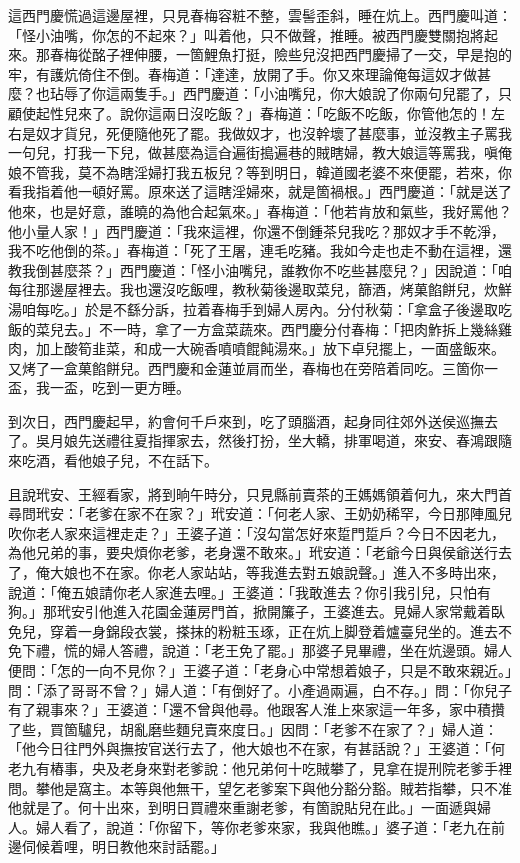 這西門慶慌過這邊屋裡，只見春梅容粧不整，雲髻歪斜，睡在炕上。西門慶叫道：「怪小油嘴，你怎的不起來？」叫着他，只不做聲，推睡。被西門慶雙關抱將起來。那春梅從酩子裡伸腰，一箇鯉魚打挺，險些兒沒把西門慶掃了一交，早是抱的牢，有護炕倚住不倒。春梅道：「達達，放開了手。你又來理論俺每這奴才做甚麼？也玷辱了你這兩隻手。」{}西門慶道：「小油嘴兒，你大娘說了你兩句兒罷了，只顧使起性兒來了。說你這兩日沒吃飯？」春梅道：「吃飯不吃飯，你管他怎的！左右是奴才貨兒，死便隨他死了罷。我做奴才，也沒幹壞了甚麼事，並沒教主子罵我一句兒，打我一下兒，做甚麼為這㒲遍街搗遍巷的賊瞎婦，教大娘這等罵我，嗔俺娘不管我，莫不為瞎淫婦打我五板兒？{}等到明日，韓道國老婆不來便罷，若來，你看我指着他一頓好罵。原來送了這瞎淫婦來，就是箇禍根。」西門慶道：「就是送了他來，也是好意，誰曉的為他合起氣來。」春梅道：「他若肯放和氣些，我好罵他？他小量人家！」西門慶道：「我來這裡，你還不倒鍾茶兒我吃？那奴才手不乾淨，我不吃他倒的茶。」春梅道：「死了王屠，連毛吃豬。我如今走也走不動在這裡，還教我倒甚麼茶？」西門慶道：「怪小油嘴兒，誰教你不吃些甚麼兒？」因說道：「咱每往那邊屋裡去。我也還沒吃飯哩，教秋菊後邊取菜兒，篩酒，烤菓餡餅兒，炊鮮湯咱每吃。」於是不繇分訴，拉着春梅手到婦人房內。分付秋菊：「拿盒子後邊取吃飯的菜兒去。」不一時，拿了一方盒菜蔬來。西門慶分付春梅：「把肉鮓拆上幾絲雞肉，加上酸筍韭菜，和成一大碗香噴噴餛飩湯來。」放下卓兒擺上，一面盛飯來。又烤了一盒菓餡餅兒。西門慶和金蓮並肩而坐，春梅也在旁陪着同吃。三箇你一盃，我一盃，吃到一更方睡。

到次日，西門慶起早，約會何千戶來到，吃了頭腦酒，起身同往郊外送侯巡撫去了。吳月娘先送禮往夏指揮家去，然後打扮，坐大轎，排軍喝道，來安、春鴻跟隨來吃酒，看他娘子兒，不在話下。

且說玳安、王經看家，將到晌午時分，只見縣前賣茶的王媽媽領着何九，來大門首尋問玳安：「老爹在家不在家？」玳安道：「何老人家、王奶奶稀罕，今日那陣風兒吹你老人家來這裡走走？」王婆子道：「沒勾當怎好來踅門踅戶？今日不因老九，為他兄弟的事，要央煩你老爹，老身還不敢來。」玳安道：「老爺今日與侯爺送行去了，俺大娘也不在家。你老人家站站，等我進去對五娘說聲。」進入不多時出來，說道：「俺五娘請你老人家進去哩。」王婆道：「我敢進去？你引我引兒，只怕有狗。」那玳安引他進入花園金蓮房門首，掀開簾子，王婆進去。見婦人家常戴着臥免兒，穿着一身錦段衣裳，搽抹的粉粧玉琢，正在炕上脚登着爐臺兒坐的。進去不免下禮，慌的婦人答禮，說道：「老王免了罷。」{}那婆子見畢禮，坐在炕邊頭。婦人便問：「怎的一向不見你？」王婆子道：「老身心中常想着娘子，只是不敢來親近。」問：「添了哥哥不曾？」婦人道：「有倒好了。小產過兩遍，白不存。」問：「你兒子有了親事來？」王婆道：「還不曾與他尋。他跟客人淮上來家這一年多，家中積攢了些，買箇驢兒，胡亂磨些麵兒賣來度日。」因問：「老爹不在家了？」婦人道：「他今日往門外與撫按官送行去了，他大娘也不在家，有甚話說？」王婆道：「何老九有樁事，央及老身來對老爹說：他兄弟何十吃賊攀了，{}見拿在提刑院老爹手裡問。攀他是窩主。本等與他無干，望乞老爹案下與他分豁分豁。賊若指攀，只不准他就是了。何十出來，到明日買禮來重謝老爹，有箇說貼兒在此。」一面遞與婦人。婦人看了，說道：「你留下，等你老爹來家，我與他瞧。」婆子道：「老九在前邊伺候着哩，明日教他來討話罷。」

